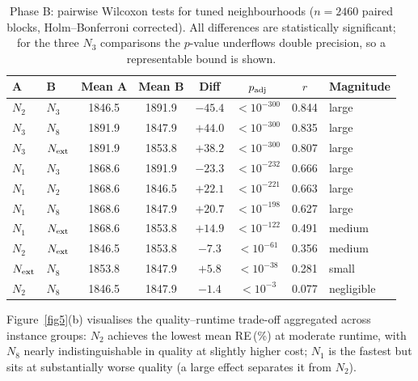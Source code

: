 \documentclass[preprint,12pt]{elsarticle}
\begin{document}
\begin{table}[t]
\centering
\caption{Phase B: pairwise Wilcoxon tests for tuned neighbourhoods ($n = 2460$ paired blocks, Holm--Bonferroni corrected). All differences are statistically significant; for the three $N_3$ comparisons the $p$-value underflows double precision, so a representable bound is shown.}
\label{tab4}
\begin{tabular}{l l c c c c c l}
\hline
A & B & Mean A & Mean B & Diff & $p_{\rm adj}$ & $r$ & Magnitude \\
\hline
$N_2$         & $N_3$         & 1846.5 & 1891.9 & $-45.4$ & $<10^{-300}$ & 0.844 & large \\
$N_3$         & $N_8$         & 1891.9 & 1847.9 & $+44.0$ & $<10^{-300}$ & 0.835 & large \\
$N_3$         & $N_{\rm ext}$ & 1891.9 & 1853.8 & $+38.2$ & $<10^{-300}$ & 0.807 & large \\
$N_1$         & $N_3$         & 1868.6 & 1891.9 & $-23.3$ & $<10^{-232}$ & 0.666 & large \\
$N_1$         & $N_2$         & 1868.6 & 1846.5 & $+22.1$ & $<10^{-221}$ & 0.663 & large \\
$N_1$         & $N_8$         & 1868.6 & 1847.9 & $+20.7$ & $<10^{-198}$ & 0.627 & large \\
$N_1$         & $N_{\rm ext}$ & 1868.6 & 1853.8 & $+14.9$ & $<10^{-122}$ & 0.491 & medium \\
$N_2$         & $N_{\rm ext}$ & 1846.5 & 1853.8 & $-7.3$  & $<10^{-61}$  & 0.356 & medium \\
$N_{\rm ext}$ & $N_8$         & 1853.8 & 1847.9 & $+5.8$  & $<10^{-38}$  & 0.281 & small \\
$N_2$         & $N_8$         & 1846.5 & 1847.9 & $-1.4$  & $<10^{-3}$   & 0.077 & negligible \\
\hline
\end{tabular}
\end{table}

Figure~\ref{fig5}(b) visualises the quality--runtime trade-off aggregated across instance groups: $N_2$ achieves the lowest mean RE\,(\%) at moderate runtime, with $N_8$ nearly indistinguishable in quality at slightly higher cost; $N_1$ is the fastest but sits at substantially worse quality (a large effect separates it from $N_2$).


\end{document}
